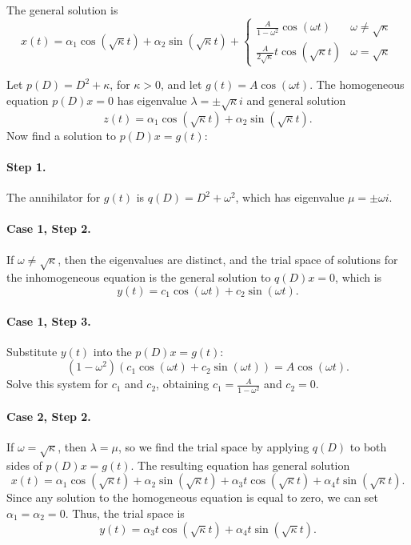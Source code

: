  \ans The general solution is
\[
x(t) = \alpha_1\cos(\sqrt{\kappa}t) + \alpha_2\sin(\sqrt{\kappa}t)
+ \left\{
\begin{array}{lr} \frac{A}{1 - \omega^2}\cos(\omega t) &
\omega \neq \sqrt{\kappa} \\
\frac{A}{2\sqrt{\kappa}}t\cos(\sqrt{\kappa}t) &
\omega = \sqrt{\kappa}
\end{array}\right.
\]

\soln Let $p(D) = D^2 + \kappa$, for $\kappa > 0$, and let $g(t) =
A\cos(\omega t)$.  The homogeneous equation $p(D)x = 0$ has eigenvalue
$\lambda = \pm \sqrt{\kappa} i$ and general solution
\[
z(t) = \alpha_1\cos(\sqrt{\kappa}t) + \alpha_2\sin(\sqrt{\kappa}t).
\]
Now find a solution to $p(D)x = g(t)$:

\paragraph{Step 1.} The annihilator for $g(t)$ is $q(D) =
D^2 + \omega^2$, which has eigenvalue $\mu = \pm \omega i$.

\paragraph{Case 1, Step 2.} If $\omega \neq \sqrt{\kappa}$, then the
eigenvalues are distinct, and the trial space of solutions for the
inhomogeneous equation is the general solution to $q(D)x = 0$, which
is
\[
y(t) = c_1\cos(\omega t) + c_2\sin(\omega t).
\]
\paragraph{Case 1, Step 3.} Substitute $y(t)$ into the $p(D)x = g(t)$:
\[
(1 - \omega^2)(c_1\cos(\omega t) + c_2\sin(\omega t)) = A\cos(\omega t).
\]
Solve this system for $c_1$ and $c_2$, obtaining $c_1 = \frac{A}
{1 - \omega^2}$ and $c_2 = 0$.

\paragraph{Case 2, Step 2.} If $\omega = \sqrt{\kappa}$, then $\lambda =
\mu$, so we find the trial space by applying $q(D)$ to both sides of
$p(D)x = g(t)$.  The resulting equation has general solution
\[
x(t) = \alpha_1\cos(\sqrt{\kappa}t) + \alpha_2\sin(\sqrt{\kappa}t)
+ \alpha_3t\cos(\sqrt{\kappa}t) + \alpha_4t\sin(\sqrt{\kappa}t).
\]
Since any solution to the homogeneous equation is equal to zero, we can
set $\alpha_1 = \alpha_2 = 0$.  Thus, the trial space is
\[
y(t) = \alpha_3t\cos(\sqrt{\kappa}t) + \alpha_4t\sin(\sqrt{\kappa}t).
\]

